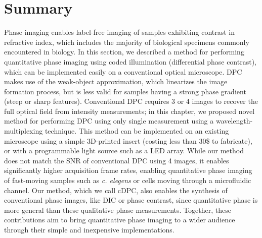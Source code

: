\section{Summary}
Phase imaging enables label-free imaging of samples exhibiting contrast in refractive index, which includes the majority of biological specimens commonly encountered in biology. In this section, we described a method for performing quantitative phase imaging using coded illumination (differential phase contrast), which can be implemented easily on a conventional optical microscope. DPC makes use of the weak-object approximation, which linearizes the image formation process, but is less valid for samples having a strong phase gradient (steep or sharp features). Conventional DPC requires 3 or 4 images to recover the full optical field from intensity measurements; in this chapter, we proposed novel method for performing DPC using only single measurement using a wavelength-multiplexing technique. This method can be implemented on an existing microscope using a simple 3D-printed insert (costing less than 30\$ to fabricate), or with a programmable light source such as a LED array. While our method does not match the SNR of conventional DPC using 4 images, it enables significantly higher acquisition frame rates, enabling quantitative phase imaging of fast-moving samples such as \textit{c. elegens} or cells moving through a microfluidic channel. Our method, which we call cDPC, also enables the synthesis of conventional phase images, like DIC or phase contrast, since quantitative phase is more general than these qualitative phase measurements. Together, these contributions aim to bring quantitative phase imaging to a wider audience through their simple and inexpensive implementations.